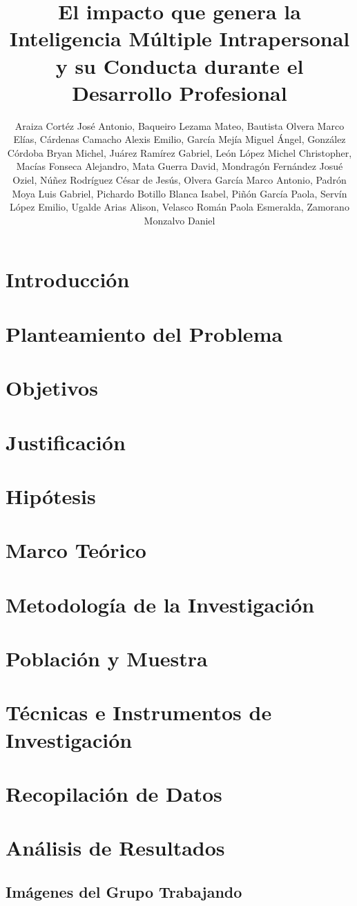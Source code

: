 \documentclass[stu,12pt]{apa7}
\affiliation{Facultad de Inform\'atica, Universidad Aut\'onoma de Quer\'etaro}
\title{El impacto que genera la Inteligencia M\'ultiple Intrapersonal y su
Conducta durante el Desarrollo Profesional}
\author{Araiza Cort\'ez Jos\'e Antonio, Baqueiro Lezama Mateo, Bautista Olvera
Marco El\'ias, C\'ardenas Camacho Alexis Emilio, Garc\'ia Mej\'ia Miguel
\'Angel, Gonz\'alez C\'ordoba Bryan Michel, Ju\'arez Ram\'irez Gabriel, Le\'on
L\'opez Michel Christopher, Mac\'ias Fonseca Alejandro, Mata Guerra David, 
Mondrag\'on Fern\'andez Josu\'e Oziel, N\'u\~nez Rodr\'iguez C\'esar de Jes\'us,
Olvera Garc\'ia Marco Antonio, Padr\'on Moya Luis Gabriel, Pichardo Botillo
Blanca Isabel, Pi\~n\'on Garc\'ia Paola, Serv\'in L\'opez Emilio, Ugalde Arias
Alison, Velasco Rom\'an Paola Esmeralda, Zamorano Monzalvo Daniel}
\begin{document}
\maketitle
\tableofcontents
\listoffigures
\listoftables
\section{Introducci\'on}

\section{Planteamiento del Problema}

\section{Objetivos}

\section{Justificaci\'on}

\section{Hip\'otesis}

\section{Marco Te\'orico}

\section{Metodolog\'ia de la Investigaci\'on}

\section{Poblaci\'on y Muestra}

\section{T\'ecnicas e Instrumentos de Investigaci\'on}

\section{Recopilaci\'on de Datos}

\section{An\'alisis de Resultados}


\begin{appendix}
\section{Im\'agenes del Grupo Trabajando}

\end{appendix}
\printbibliography
\end{document}

